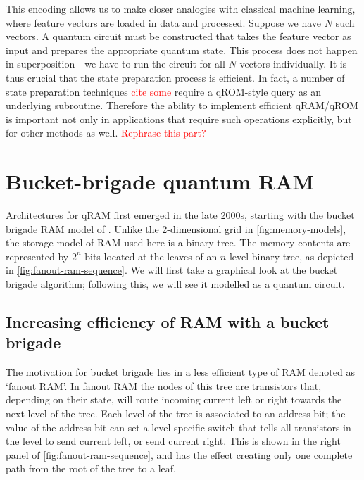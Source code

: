 \documentclass[a4paper,12pt]{article}
\newcommand\todo[1]{\textcolor{red}{#1}}
\begin{document}
This encoding allows us to make closer analogies with classical machine learning, where feature vectors are loaded in data and processed.
Suppose we have $N$ such vectors.
A quantum circuit must be constructed that takes the feature vector as input and prepares the appropriate quantum state.
This process does not happen in superposition - we have to run the circuit for all $N$ vectors individually.
It is thus crucial that the state preparation process is efficient.
In fact, a number of state preparation techniques \todo{cite some} require a qROM-style query as an underlying subroutine.
Therefore the ability to implement efficient qRAM/qROM is important not only in applications that require such operations explicitly, but for other methods as well.
\todo{Rephrase this part?}



\section{Bucket-brigade quantum RAM}
\label{sec:bb}

Architectures for qRAM first emerged in the late 2000s, starting with the bucket brigade RAM model of \cite{Giovannetti2008, Giovannetti2008b}. 
Unlike the 2-dimensional grid in \autoref{fig:memory-models}, the storage model of RAM used here is a binary tree.
The memory contents are represented by $2^n$ bits located at the leaves of an $n$-level binary tree, as depicted in \autoref{fig:fanout-ram-sequence}. 
We will first take a graphical look at the bucket brigade algorithm; following this, we will see it modelled as a quantum circuit.

\subsection{Increasing efficiency of RAM with a bucket brigade}

The motivation for bucket brigade lies in a less efficient type of RAM denoted as `fanout RAM'. 
In fanout RAM the nodes of this tree are transistors that, depending on their state, will route incoming current left or right towards the next level of the tree. 
Each level of the tree is associated to an address bit; the value of the address bit can set a level-specific switch that tells all transistors in the level to send current left, or send current right. 
This is shown in the right panel of \autoref{fig:fanout-ram-sequence}, and has the effect creating only one complete path from the root of the tree to a leaf.
\end{document}
